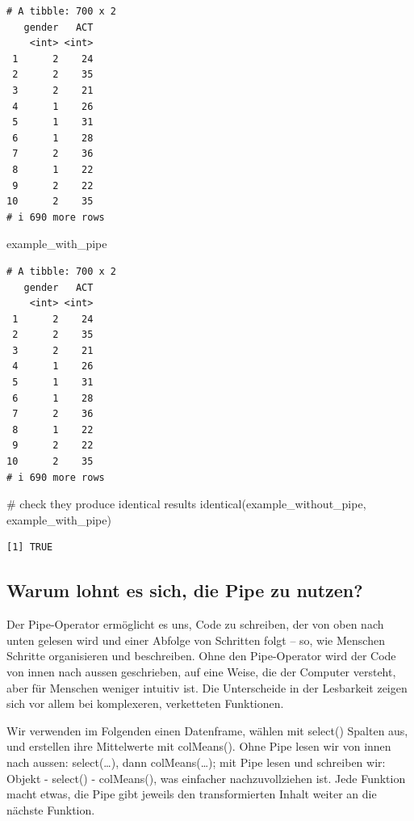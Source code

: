 \documentclass[
  letterpaper,
  DIV=11,
  numbers=noendperiod]{scrreprt}
\newenvironment{Shaded}{\begin{snugshade}}{\end{snugshade}}
\newcommand{\CommentTok}[1]{\textcolor[rgb]{0.37,0.37,0.37}{#1}}
\newcommand{\FunctionTok}[1]{\textcolor[rgb]{0.28,0.35,0.67}{#1}}
\newcommand{\NormalTok}[1]{\textcolor[rgb]{0.00,0.23,0.31}{#1}}
\begin{document}
\begin{verbatim}
# A tibble: 700 x 2
   gender   ACT
    <int> <int>
 1      2    24
 2      2    35
 3      2    21
 4      1    26
 5      1    31
 6      1    28
 7      2    36
 8      1    22
 9      2    22
10      2    35
# i 690 more rows
\end{verbatim}

\begin{Shaded}
\begin{Highlighting}[]
\NormalTok{example\_with\_pipe}
\end{Highlighting}
\end{Shaded}

\begin{verbatim}
# A tibble: 700 x 2
   gender   ACT
    <int> <int>
 1      2    24
 2      2    35
 3      2    21
 4      1    26
 5      1    31
 6      1    28
 7      2    36
 8      1    22
 9      2    22
10      2    35
# i 690 more rows
\end{verbatim}

\begin{Shaded}
\begin{Highlighting}[]
\CommentTok{\# check they produce identical results}
\FunctionTok{identical}\NormalTok{(example\_without\_pipe, example\_with\_pipe)}
\end{Highlighting}
\end{Shaded}

\begin{verbatim}
[1] TRUE
\end{verbatim}

\subsection{Warum lohnt es sich, die Pipe zu
nutzen?}\label{warum-lohnt-es-sich-die-pipe-zu-nutzen}

Der Pipe-Operator ermöglicht es uns, Code zu schreiben, der von oben
nach unten gelesen wird und einer Abfolge von Schritten folgt -- so, wie
Menschen Schritte organisieren und beschreiben. Ohne den Pipe-Operator
wird der Code von innen nach aussen geschrieben, auf eine Weise, die der
Computer versteht, aber für Menschen weniger intuitiv ist. Die
Unterscheide in der Lesbarkeit zeigen sich vor allem bei komplexeren,
verketteten Funktionen.

Wir verwenden im Folgenden einen Datenframe, wählen mit select() Spalten
aus, und erstellen ihre Mittelwerte mit colMeans(). Ohne Pipe lesen wir
von innen nach aussen: select(\ldots), dann colMeans(\ldots); mit Pipe
lesen und schreiben wir: Objekt - select() - colMeans(), was einfacher
nachzuvollziehen ist. Jede Funktion macht etwas, die Pipe gibt jeweils
den transformierten Inhalt weiter an die nächste Funktion.
\end{document}
